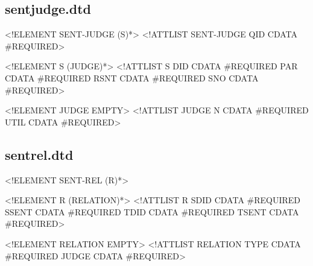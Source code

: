 \documentclass[10pt]{article}
\begin{document}
\subsection{sentjudge.dtd}
\begin{center}
\begin{boxedverbatim}
<!ELEMENT SENT-JUDGE (S)*>
<!ATTLIST SENT-JUDGE
    QID  CDATA  #REQUIRED>

<!ELEMENT S (JUDGE)*>
<!ATTLIST S
    DID  CDATA #REQUIRED
    PAR  CDATA #REQUIRED
    RSNT CDATA #REQUIRED
    SNO  CDATA #REQUIRED>

<!ELEMENT JUDGE EMPTY>
<!ATTLIST JUDGE
    N    CDATA #REQUIRED
    UTIL CDATA #REQUIRED>
\end{boxedverbatim}
\end{center}



\subsection{sentrel.dtd}
\begin{center}
\begin{boxedverbatim}
<!ELEMENT SENT-REL (R)*>

<!ELEMENT R (RELATION)*>
<!ATTLIST R 
   SDID         CDATA   #REQUIRED
   SSENT        CDATA   #REQUIRED
   TDID         CDATA   #REQUIRED
   TSENT        CDATA   #REQUIRED>

<!ELEMENT RELATION EMPTY>
<!ATTLIST RELATION 
   TYPE         CDATA   #REQUIRED
   JUDGE        CDATA   #REQUIRED>
\end{boxedverbatim}
\end{center}
\end{document}
